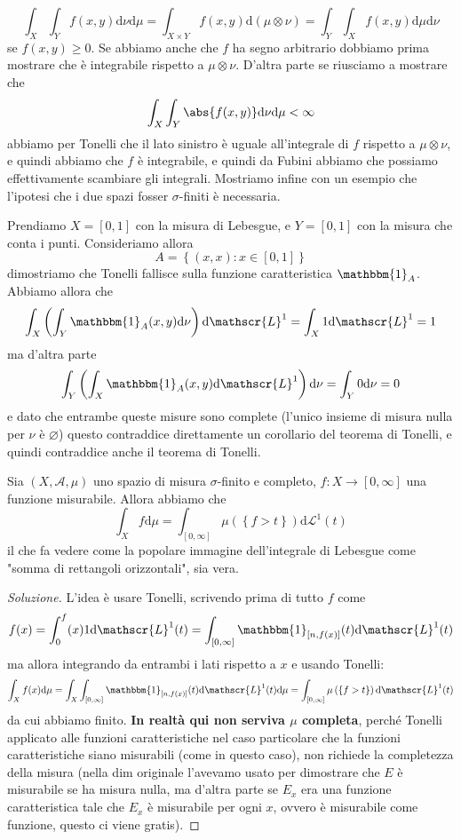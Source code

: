 \documentclass[11pt]{scrartcl}
\newcommand{\dif}{\text{d}}
\newcommand{\eset}{\varnothing}
\begin{document}
	$$\int_X\int_Y f(x,y)\dif \nu \dif \mu = \int_{X\times Y} f(x,y)\dif \left(\mu \otimes \nu\right)= \int_Y \int_X f(x,y)\dif \mu \dif \nu$$
	se $f(x,y)\ge 0$. Se abbiamo anche che $f$ ha segno arbitrario dobbiamo prima mostrare che è integrabile rispetto a $\mu \otimes \nu$. D'altra parte se riusciamo a mostrare che 
	$$\int_X \int_Y \abs{f(x,y)}\dif \nu \dif \mu <\infty$$
	abbiamo per Tonelli che il lato sinistro è uguale all'integrale di $f$ rispetto a $\mu \otimes \nu$, e quindi abbiamo che $f$ è integrabile, e quindi da Fubini abbiamo che possiamo effettivamente scambiare gli integrali. Mostriamo infine con un esempio che l'ipotesi che i due spazi fosser $\sigma$-finiti è necessaria.
	\begin{example}
		Prendiamo $X=[0,1]$ con la misura di Lebesgue, e $Y=[0,1]$ con la misura che conta i punti. Consideriamo allora
		$$A=\left\{(x,x):x\in [0,1]\right\}$$
		dimostriamo che Tonelli fallisce sulla funzione caratteristica $\mathbbm{1}_A$. Abbiamo allora che
		$$\int_X\left(\int_Y\mathbbm{1}_A(x,y) \dif \nu \right)\dif \mathscr{L}^1=\int_X 1\dif \mathscr{L}^1=1$$
		ma d'altra parte
		$$\int_Y\left(\int_X \mathbbm{1}_A(x,y) \dif \mathscr{L}^1\right)\dif \nu = \int_Y 0 \dif \nu =0$$
		e dato che entrambe queste misure sono complete (l'unico insieme di misura nulla per $\nu$ è $\eset$) questo contraddice direttamente un corollario del teorema di Tonelli, e quindi contraddice anche il teorema di Tonelli.
	\end{example}
	\begin{exercise}
		Sia $(X,\mathcal{A},\mu)$ uno spazio di misura $\sigma$-finito e completo,  $f:X\to[0,\infty]$ una funzione misurabile. Allora abbiamo che 
		$$\int_X f \dif \mu = \int_{[0,\infty]}\mu\left(\left\{f>t\right\}\right)\dif \mathscr{L}^1(t)$$
		il che fa vedere come la popolare immagine dell'integrale di Lebesgue come "somma di rettangoli orizzontali", sia vera.
	\end{exercise}
	\begin{proof}[Soluzione]
		L'idea è usare Tonelli, scrivendo prima di tutto $f$ come
		$$f(x)=\int_0^f(x)1\dif \mathscr{L}^1(t)=\int_{[0,\infty]}\mathbbm{1}_{[n,f(x)]}(t)\dif \mathscr{L}^1(t)$$
		ma allora integrando da entrambi i lati rispetto a $x$ e usando Tonelli:
		$$\int_X f(x)\dif \mu = \int_X\int_{[0,\infty]}\mathbbm{1}_{[n,f(x)]}(t)\dif \mathscr{L}^1(t)\dif \mu=\int_{[0,\infty]}\mu\left(\left\{f>t\right\}\right)\dif \mathscr{L}^1(t) $$
		da cui abbiamo finito. \textbf{In realtà qui non serviva $\mu$ completa}, perché Tonelli applicato alle funzioni caratteristiche nel caso particolare che la funzioni caratteristiche siano misurabili (come in questo caso), non richiede la completezza della misura (nella dim originale l'avevamo usato per dimostrare che $E$ è misurabile se ha misura nulla, ma d'altra parte se $E_x$ era una funzione caratteristica tale che $E_x$ è misurabile per ogni $x$, ovvero è misurabile come funzione, questo ci viene gratis). 
	\end{proof}
	
\end{document}
